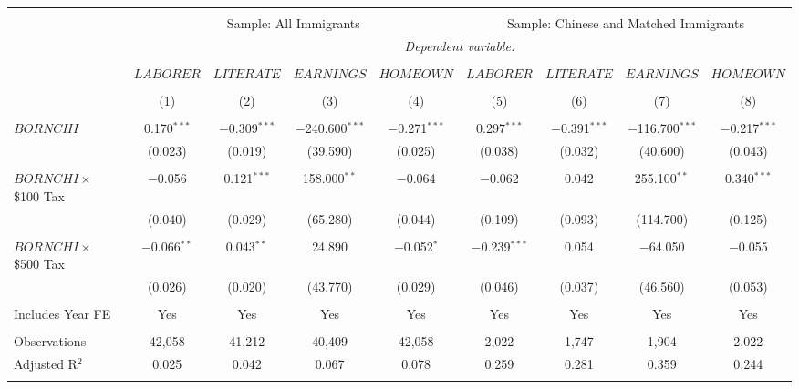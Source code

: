
\begin{tabular}{@{\extracolsep{5pt}}lcccccccc} 
\\[-1.8ex]\hline 
\hline \\[-1.8ex] 
 & \multicolumn{4}{c}{Sample: All Immigrants} & \multicolumn{4}{c}{Sample: Chinese and Matched Immigrants} \\ 
 & \multicolumn{8}{c}{\textit{Dependent variable:}} \\ 
\cline{2-9} 
\\[-1.8ex] & $LABORER$ & $LITERATE$ & $EARNINGS$ & $HOMEOWN$ & $LABORER$ & $LITERATE$ & $EARNINGS$ & $HOMEOWN$ \\ 
\\[-1.8ex] & (1) & (2) & (3) & (4) & (5) & (6) & (7) & (8)\\ 
\hline \\[-1.8ex] 
 $BORNCHI$ & 0.170$^{***}$ & $-$0.309$^{***}$ & $-$240.600$^{***}$ & $-$0.271$^{***}$ & 0.297$^{***}$ & $-$0.391$^{***}$ & $-$116.700$^{***}$ & $-$0.217$^{***}$ \\ 
  & (0.023) & (0.019) & (39.590) & (0.025) & (0.038) & (0.032) & (40.600) & (0.043) \\ 
  & & & & & & & & \\ 
 $BORNCHI \times$ \$100 Tax & $-$0.056 & 0.121$^{***}$ & 158.000$^{**}$ & $-$0.064 & $-$0.062 & 0.042 & 255.100$^{**}$ & 0.340$^{***}$ \\ 
  & (0.040) & (0.029) & (65.280) & (0.044) & (0.109) & (0.093) & (114.700) & (0.125) \\ 
  & & & & & & & & \\ 
 $BORNCHI \times$ \$500 Tax & $-$0.066$^{**}$ & 0.043$^{**}$ & 24.890 & $-$0.052$^{*}$ & $-$0.239$^{***}$ & 0.054 & $-$64.050 & $-$0.055 \\ 
  & (0.026) & (0.020) & (43.770) & (0.029) & (0.046) & (0.037) & (46.560) & (0.053) \\ 
  & & & & & & & & \\ 
Includes Year FE & Yes & Yes & Yes & Yes & Yes & Yes & Yes & Yes \\ 
\hline \\[-1.8ex] 
Observations & 42,058 & 41,212 & 40,409 & 42,058 & 2,022 & 1,747 & 1,904 & 2,022 \\ 
Adjusted R$^{2}$ & 0.025 & 0.042 & 0.067 & 0.078 & 0.259 & 0.281 & 0.359 & 0.244 \\ 
\hline \\[-1.8ex] 
\end{tabular} 
